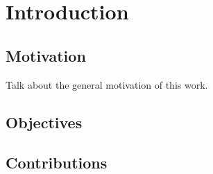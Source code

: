 %

\chapter{Introduction}
\label{sec:introduction}



\section{Motivation}
Talk about the general motivation of this work.


\section{Objectives}


\section{Contributions}
